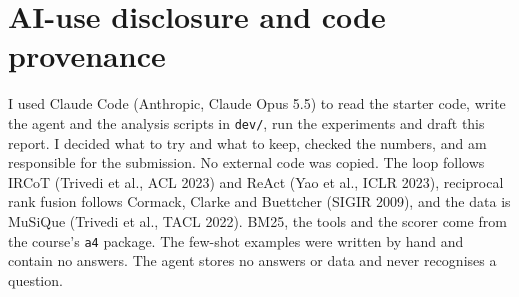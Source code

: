 \documentclass[10pt,a4paper]{article}
\begin{document}
\section{AI-use disclosure and code provenance}
I used Claude Code (Anthropic, Claude Opus 5.5) to read the starter code, write the agent and the analysis scripts
in \texttt{dev/}, run the experiments and draft this report. I decided what to try and what to keep, checked the
numbers, and am responsible for the submission. No external code was copied. The loop follows IRCoT (Trivedi et
al., ACL 2023) and ReAct (Yao et al., ICLR 2023), reciprocal rank fusion follows Cormack, Clarke and Buettcher
(SIGIR 2009), and the data is MuSiQue (Trivedi et al., TACL 2022). BM25, the tools and the scorer come from the
course's \texttt{a4} package. The few-shot examples were written by hand and contain no answers. The agent stores
no answers or data and never recognises a question.
\end{document}
